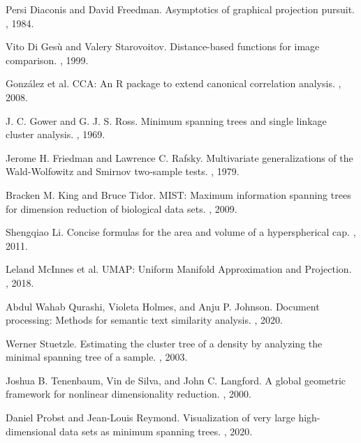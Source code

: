 \documentclass{article}
\begin{document}
{\begin{thebibliography}{99}
Persi Diaconis and David Freedman.
\newblock Asymptotics of graphical projection pursuit.
, 1984.

Vito Di Ges\`u and Valery Starovoitov.
\newblock Distance-based functions for image comparison.
, 1999.

Gonz\'alez et al.
\newblock CCA: An R package to extend canonical correlation analysis.
, 2008.

J. C. Gower and G. J. S. Ross.
\newblock Minimum spanning trees and single linkage cluster analysis.
, 1969.

Jerome H. Friedman and Lawrence C. Rafsky.
\newblock Multivariate generalizations of the Wald-Wolfowitz and Smirnov two-sample tests.
, 1979.

Bracken M. King and Bruce Tidor.
\newblock MIST: Maximum information spanning trees for dimension reduction of biological data sets.
, 2009.

Shengqiao Li.
\newblock Concise formulas for the area and volume of a hyperspherical cap.
, 2011.

Leland McInnes et al.
\newblock UMAP: Uniform Manifold Approximation and Projection.
, 2018.

Abdul Wahab Qurashi, Violeta Holmes, and Anju P. Johnson.
\newblock Document processing: Methods for semantic text similarity analysis.
, 2020.

Werner Stuetzle.
\newblock Estimating the cluster tree of a density by analyzing the minimal spanning tree of a sample.
, 2003.

Joshua B. Tenenbaum, Vin de Silva, and John C. Langford.
\newblock A global geometric framework for nonlinear dimensionality reduction.
, 2000.

Daniel Probst and Jean-Louis Reymond.
\newblock Visualization of very large high-dimensional data sets as minimum spanning trees.
, 2020.


\end{thebibliography}}
\end{document}
